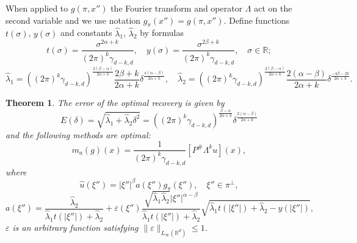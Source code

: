 \documentclass[12pt]{iopart}
\newtheorem{theorem}{Theorem}
\begin{document}
	When applied to $g(\pi,x'')$ the Fourier transform and operator $\Lambda$ act on the second variable and we use notation $g_\pi(x'')=g(\pi,x'')$. Define functions $t(\sigma)$, $y(\sigma)$ and constants $\widehat\lambda_1$, $\widehat\lambda_2$ by formulas
	\begin{equation}
	\label{xy}
	t(\sigma)=\frac{\sigma^{2\alpha+k}}{(2\pi)^{k}\gamma_{d-k,d}},\quad
	y(\sigma)=\frac{\sigma^{2\beta+k}}{(2\pi)^{k}\gamma_{d-k,d}},\quad \sigma\in\mathbb R;
	\end{equation}
	\begin{equation}
	\label{lambda}
	\widehat\lambda_1=((2\pi)^k\gamma_{d-k,d})^{\frac{2(\beta-\alpha)}{2\alpha+k}}\frac{2\beta+k}{2\alpha+k}\delta^\frac{4(\alpha-\beta)}{2\alpha+k},\quad \widehat\lambda_2=((2\pi)^k\gamma_{d-k,d})^{\frac{2(\beta-\alpha)}{2\alpha+k}}\frac{2(\alpha-\beta)}{2\alpha+k}\delta^\frac{-4\beta-2k}{2\alpha+k}. 
	\end{equation}
	
	\begin{theorem}
		\label{theorem}
		The error of the optimal recovery is given by
		\[
		E(\delta)=\sqrt{\widehat\lambda_1+\widehat\lambda_2\delta^2}=((2\pi)^k\gamma_{d-k,d})^{\frac{\beta-\alpha}{2\alpha+k}}\delta^{\frac{2(\alpha-\beta)}{2\alpha+k}}
		\]
		and the following methods are optimal:
		\begin{equation}
		\label{method}
		m_a(g)(x) = \frac{1}{(2\pi)^k\gamma_{d-k,d}}[P^\#\Lambda^ku](x),
		\end{equation}
		where	
		$$\widehat{u}(\xi'')=|\xi''|^\beta a(\xi'')\widehat{g_\pi }(\xi''),\quad \xi''\in\pi^\perp,$$
		\begin{equation}
		\label{a}
		a(\xi'')=\frac{\widehat\lambda_2}{\widehat\lambda_1t(|\xi''|)+\widehat\lambda_2}+\varepsilon(\xi'')\frac{\sqrt{\widehat\lambda_1\widehat\lambda_2}|\xi''|^{\alpha-\beta}}{\widehat\lambda_1t(|\xi''|)+\widehat\lambda_2}\sqrt{\widehat\lambda_1t(|\xi''|)+\widehat\lambda_2-y(|\xi''|)},
		\end{equation}
		$\varepsilon$ is an arbitrary function satisfying $\|\varepsilon\|_{L_\infty(\mathbb R^d)}\leqslant 1$.
	\end{theorem}
	
\end{document}

